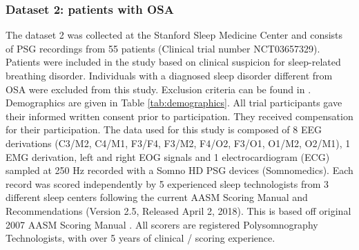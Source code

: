 \documentclass[journal]{IEEEtran}
\begin{document}
\subsubsection{Dataset 2: patients with OSA}
The dataset 2 was collected at the Stanford Sleep Medicine Center and consists of PSG recordings from 55 patients (Clinical trial number NCT03657329). Patients were included in the study based on clinical suspicion for sleep-related breathing disorder. Individuals with a diagnosed sleep disorder different from OSA were excluded from this study. Exclusion criteria can be found in \cite{thorey2019}. Demographics are given in Table \ref{tab:demographics}. All trial participants gave their informed written consent prior to participation. They received compensation for their participation.
The data used for this study is composed of 8 EEG derivations (C3/M2, C4/M1, F3/F4, F3/M2, F4/O2, F3/O1, O1/M2, O2/M1), 1 EMG derivation, left and right EOG signals and 1 electrocardiogram (ECG) sampled at 250 Hz recorded with a Somno HD PSG devices (Somnomedics).
Each record was scored independently by 5 experienced sleep technologists from 3 different sleep centers following the current AASM Scoring Manual and Recommendations (Version 2.5, Released April 2, 2018). This is based off original 2007 AASM Scoring Manual \cite{Iber2007TheSpecifications}. All scorers are registered Polysomnography Technologists, with over 5 years of clinical / scoring experience.

\begin{table}[H]
\centering
{}
\caption{Demographics for DOD-H and DOD-O. More information can be found here \cite{Arnal662734} for DOD-H and \cite{thorey2019} for DOD-O. All values are average across all subjects.}
\label{tab:demographics}
\vspace{-2em}
\end{table} 
\end{document}
